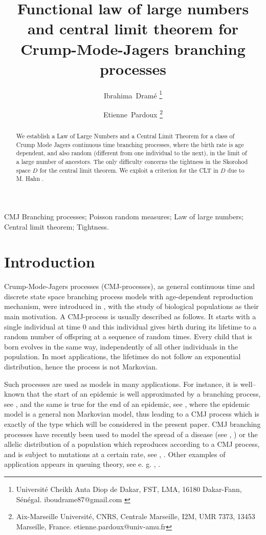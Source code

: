 \documentclass[11pt]{article}
\begin{document}
\title{Functional law of large numbers and central limit theorem for Crump-Mode-Jagers branching processes}

\author{
Ibrahima~Dram\'{e}  \footnote{  \scriptsize{Université Cheikh Anta Diop de Dakar, FST, LMA, 16180 Dakar-Fann, S\'en\'egal. iboudrame87@gmail.com
}}
\and
Etienne~Pardoux \setcounter{footnote}{6}\footnote{ \scriptsize {Aix-Marseille Universit\'{e}, CNRS,  Centrale Marseille, I2M, UMR 7373, 13453 Marseille, France. etienne.pardoux@univ-amu.fr}}%
}

\maketitle

\begin{abstract}
We establish a Law of Large Numbers and a Central Limit Theorem for a class of Crump Mode Jagers continuous time branching processes, where the birth rate is age dependent, and also random (different from one individual to the next), in the limit of a large number of ancestors. The only difficulty concerns the tightness in the Skorohod space $D$  for the central limit theorem. We exploit a criterion for the CLT in $D$ due to M. Hahn \cite{MH}. 
\end{abstract}

\vskip 3mm
 CMJ Branching processes; Poisson random measures; Law of large numbers; Central limit theorem; Tightness.
\vskip 3mm

\section{Introduction}
Crump-Mode-Jagers processes (CMJ-processes), as general continuous time and discrete state space branching process models with age-dependent reproduction mechanism, were introduced in \cite{CJ}, \cite{JA} with the study of biological populations as their main motivation. A CMJ-process is usually described as follows. It starts with a single individual at time 0 and this individual gives birth during its lifetime to a random number of offspring at a sequence of random times. Every child that is born evolves in the same way, independently of all other individuals in the population. In most applications, the lifetimes do not follow an exponential distribution, hence the process is not Markovian. 

Such processes are used as models in many applications. For instance, it is well--known that  the start of an epidemic is well approximated by a branching process, see \cite{BP}, and the same is true for the end of an epidemic, see
\cite{MDNP}, where the epidemic model is a general non Markovian model, thus leading to a CMJ process which is exactly of the type which will be considered in the present paper. CMJ branching processes have recently been used to model the spread of a disease (see \cite{BGMS}, \cite{OS}) or the allelic distribution of a population which reproduces according to a CMJ process, and is subject to mutations at a certain rate, see \cite{NCAL}, \cite{NCAL2}. Other examples of application appears in queuing theory, see e. g. \cite{GS}, \cite{LSZ}. 
\end{document}
